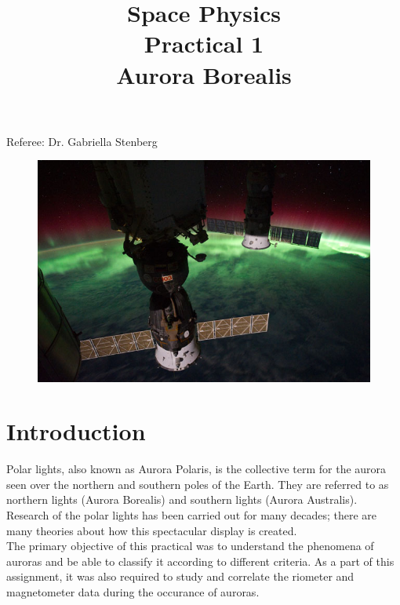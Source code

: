 \documentclass{article}
\title{\textbf {Space Physics} \\ Practical 1\\ Aurora Borealis} %
\author{\authors}
\begin{document}
\maketitle %

\centerline{Referee: Dr. Gabriella Stenberg}

\vspace{10mm}
\begin{figure}[h!]
\centering
\centerline{\includegraphics[width=\textwidth]{Figures/iss.jpg}}
\label{fig:iss}
\end{figure}

\setlength\parindent{0pt} %

\renewcommand{\labelenumi}{\alph{enumi}.} %
\clearpage

\tableofcontents

\listoffigures

\clearpage


\section{Introduction}
Polar lights, also known as Aurora Polaris, is the collective term for the aurora seen over the northern and southern poles of the Earth. They are referred to as northern lights (Aurora Borealis) and southern lights (Aurora Australis). Research of the polar lights has been carried out for many decades; there are many theories about how this spectacular display is created. \cite{Stenberg:2012ab}\\ 
The primary objective of this practical was to understand the phenomena of auroras and be able to classify it according to different criteria. As a part of this assignment, it was also required to study and correlate the riometer and magnetometer data during the occurance of auroras.
\end{document}
